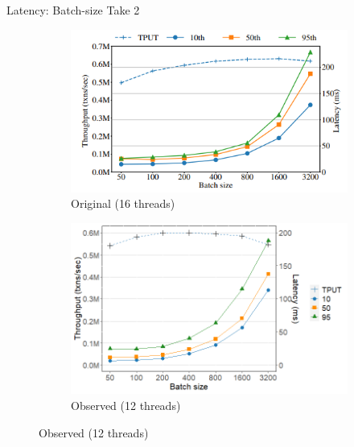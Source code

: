 \documentclass[notes, xcolor=dvipsnames]{beamer}
\begin{document}
    \begin{frame}{Latency: Batch-size Take 2}
        \begin{figure}
            \begin{subfigure}[h]{0.4\linewidth}
                \includegraphics[scale=0.50]{rolis_fig16.png}
                \caption{Original (16 threads)}
            \end{subfigure}
            \hfill
            \begin{subfigure}[h]{0.5\linewidth}
                \includegraphics[scale=0.30]{fig16_12t.png}
                \caption{Observed (12 threads)}
            \end{subfigure}
        \end{figure}
    \end{frame}
\end{document}
